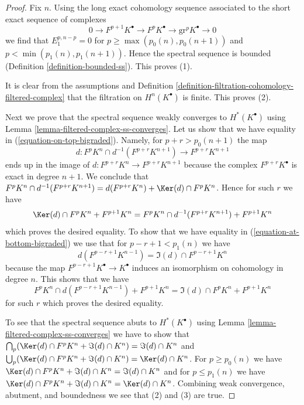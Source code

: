 \begin{proof}
Fix $n$. Using the long exact cohomology sequence associated to
the short exact sequence of complexes
$$
0 \to F^{p + 1}K^\bullet \to F^pK^\bullet \to \text{gr}^pK^\bullet \to 0
$$
we find that $E_1^{p, n - p} = 0$ for $p \geq \max(p_0(n), p_0(n + 1))$ and
$p < \min(p_1(n), p_1(n + 1))$. Hence the spectral sequence is bounded
(Definition \ref{definition-bounded-ss}). This proves (1).

\medskip\noindent
It is clear from the assumptions and
Definition \ref{definition-filtration-cohomology-filtered-complex}
that the filtration on $H^n(K^\bullet)$ is finite. This proves (2).

\medskip\noindent
Next we prove that the spectral sequence weakly converges to
$H^*(K^\bullet)$ using
Lemma \ref{lemma-filtered-complex-ss-converges}.
Let us show that we have equality in (\ref{equation-on-top-bigraded}).
Namely, for $p + r > p_0(n + 1)$ the map
$$
d : F^pK^{n} \cap d^{-1}(F^{p + r}K^{n + 1}) \to F^{p + r}K^{n + 1}
$$
ends up in the image of $d : F^{p + r}K^n \to F^{p + r}K^{n + 1}$
because the complex $F^{p + r}K^\bullet$ is exact in degree $n + 1$.
We conclude that $F^pK^{n} \cap d^{-1}(F^{p + r}K^{n + 1}) =
d(F^{p + r}K^n) + \Ker(d) \cap F^pK^n$. Hence for such $r$ we have
$$
\Ker(d) \cap F^pK^{n} + F^{p + 1}K^{n} =
F^pK^{n} \cap d^{-1}(F^{p + r}K^{n + 1}) + F^{p + 1}K^{n}
$$
which proves the desired equality. To show that we have equality in
(\ref{equation-at-bottom-bigraded}) we use that for $p - r + 1 < p_1(n)$
we have
$$
d(F^{p - r + 1}K^{n - 1}) = \Im(d) \cap F^{p - r + 1}K^n
$$
because the map $F^{p - r + 1}K^\bullet \to K^\bullet$ induces an
isomorphism on cohomology in degree $n$. This shows that
we have
$$
F^pK^{n} \cap d(F^{p - r + 1}K^{n - 1}) + F^{p + 1}K^{n} =
\Im(d) \cap F^pK^{n} + F^{p + 1}K^{n}
$$
for such $r$ which proves the desired equality.

\medskip\noindent
To see that the spectral sequence abuts to $H^*(K^\bullet)$ using
Lemma \ref{lemma-filtered-complex-ss-converges} we have to show that
$\bigcap_p (\Ker(d) \cap F^pK^n + \Im(d) \cap K^n) = \Im(d) \cap K^n$
and
$\bigcup_p (\Ker(d) \cap F^pK^n + \Im(d) \cap K^n) = \Ker(d) \cap K^n$.
For $p \geq p_0(n)$ we have
$\Ker(d) \cap F^pK^n + \Im(d) \cap K^n = \Im(d) \cap K^n$
and for $p \leq p_1(n)$ we have
$\Ker(d) \cap F^pK^n + \Im(d) \cap K^n = \Ker(d) \cap K^n$.
Combining weak convergence, abutment, and boundedness we see
that (2) and (3) are true.
\end{proof}






















